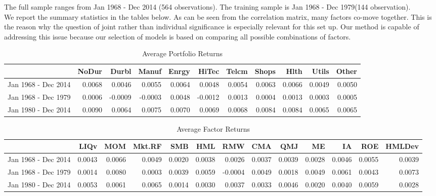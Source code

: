 \documentclass[12pt]{article}
\begin{document}
The full sample ranges from Jan 1968 - Dec 2014 (564 observations). The training sample is Jan 1968 - Dec 1979(144 observation). \\
We report the summary statistics in the tables below. As can be seen from the correlation matrix, many factors co-move together. This is the reason why the question of joint rather than individual significance is especially relevant for this set up. Our method is capable of addressing this issue because our selection of models is based on comparing all possible combinations of factors.
\begin{table}[ht]
	\footnotesize
	\centering
	\begin{tabular}{rrrrrrrrrrr}
		\hline
		& NoDur & Durbl & Manuf & Enrgy & HiTec & Telcm & Shops & Hlth & Utils & Other \\ 
		\hline
		Jan 1968 - Dec 2014 & 0.0068 & 0.0046 & 0.0055 & 0.0064 & 0.0048 & 0.0054 & 0.0063 & 0.0066 & 0.0049 & 0.0050 \\ 
		Jan 1968 - Dec 1979 & 0.0006 & -0.0009 & -0.0003 & 0.0048 & -0.0012 & 0.0013 & 0.0004 & 0.0013 & 0.0003 & 0.0005 \\ 
			Jan 1980 - Dec 2014 & 0.0090 & 0.0064 & 0.0075 & 0.0070 & 0.0069 & 0.0068 & 0.0084 & 0.0084 & 0.0065 & 0.0065 \\ 
		\hline
	\end{tabular}
		\caption{Average Portfolio Returns}
\end{table}
\begin{table}[ht]
	\scriptsize
	\centering
	\begin{tabular}{rrrrrrrrrrrrr}
		\hline
		& LIQv & MOM & Mkt.RF & SMB & HML & RMW & CMA & QMJ & ME & IA & ROE & HMLDev \\ 
		\hline
		 Jan 1968 - Dec 2014 & 0.0043 & 0.0066 & 0.0049 & 0.0020 & 0.0038 & 0.0026 & 0.0037 & 0.0039 & 0.0028 & 0.0046 & 0.0055 & 0.0039 \\ 
		Jan 1968 - Dec 1979 & 0.0014 & 0.0080 & 0.0003 & 0.0039 & 0.0059 & -0.0004 & 0.0049 & 0.0018 & 0.0049 & 0.0061 & 0.0043 & 0.0073 \\ 
		Jan 1980 - Dec 2014 & 0.0053 & 0.0061 & 0.0065 & 0.0014 & 0.0030 & 0.0037 & 0.0033 & 0.0046 & 0.0020 & 0.0040 & 0.0059 & 0.0028 \\ 
		\hline
	\end{tabular}
	\caption{Average Factor Returns}
\end{table}
\end{document}
